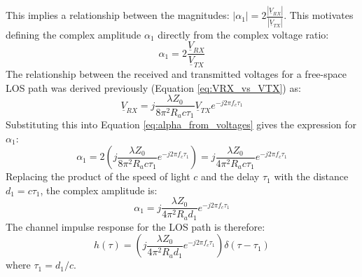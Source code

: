This implies a relationship between the magnitudes: $|\alpha_1| = 2 \frac{|\underline{V}_{RX}|}{|\underline{V}_{TX}|}$. This motivates defining the complex amplitude $\alpha_1$ directly from the complex voltage ratio:
\begin{equation}
	\alpha_1 = 2 \frac{\underline{V}_{RX}}{\underline{V}_{TX}}
	\label{eq:alpha_from_voltages}
\end{equation}
The relationship between the received and transmitted voltages for a free-space LOS path was derived previously (Equation \ref{eq:VRX_vs_VTX}) as:
\begin{equation}
	\underline{V}_{RX} = j \frac{\lambda Z_0}{8\pi^2 R_a c\tau_1} \underline{V}_{TX} e^{-j2\pi f_c \tau_1}
\end{equation}
Substituting this into Equation \ref{eq:alpha_from_voltages} gives the expression for $\alpha_1$:
\begin{equation}
	\alpha_1 = 2 \left( j \frac{\lambda Z_0}{8\pi^2 R_a c\tau_1} e^{-j2\pi f_c \tau_1} \right) = j \frac{\lambda Z_0}{4\pi^2 R_a c\tau_1} e^{-j2\pi f_c \tau_1}
\end{equation}
Replacing the product of the speed of light $c$ and the delay $\tau_1$ with the distance $d_1 = c\tau_1$, the complex amplitude is:
\begin{equation}
	\alpha_1 = j \frac{\lambda Z_0}{4\pi^2 R_a d_1} e^{-j2\pi f_c \tau_1}
	\label{eq:alpha1_derived}
\end{equation}
The channel impulse response for the LOS path is therefore:
\begin{equation}
	h(\tau) = \left( j \frac{\lambda Z_0}{4\pi^2 R_a d_1} e^{-j2\pi f_c \tau_1} \right) \delta(\tau - \tau_1)
	\label{eq:los_impulse_response_derived_detailed}
\end{equation}
where $\tau_1 = d_1/c$.

